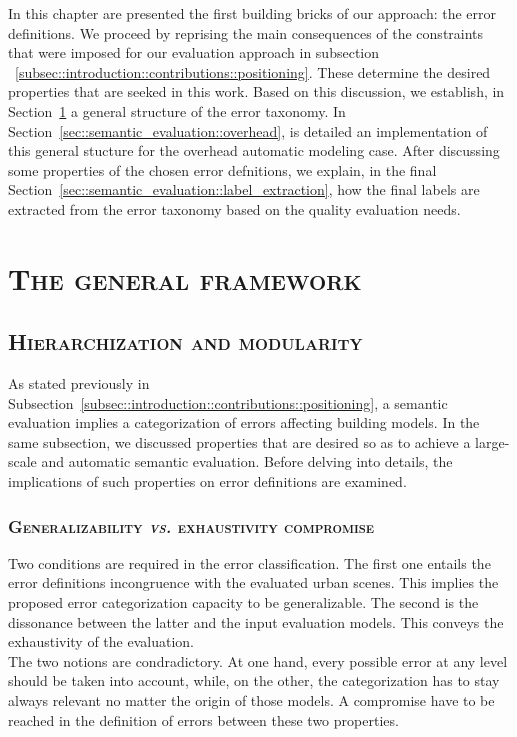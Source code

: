 \minitoc

\vfill

In this chapter are presented the first building bricks of our approach: the error definitions.
We proceed by reprising the main consequences of the constraints that were imposed for our evaluation approach in subsection ~\ref{subsec::introduction::contributions::positioning}.
These determine the desired properties that are seeked in this work.
Based on this discussion, we establish, in Section~\ref{sec::semantic_evaluation::general_framework} a general structure of the error taxonomy.
In Section~\ref{sec::semantic_evaluation::overhead}, is detailed an implementation of this general stucture for the overhead automatic modeling case.
After discussing some properties of the chosen error defnitions, we explain, in the final Section~\ref{sec::semantic_evaluation::label_extraction}, how the final labels are extracted from the error taxonomy based on the quality evaluation needs.

\clearpage

\section{\textsc{The general framework}}
    \label{sec::semantic_evaluation::general_framework}

    \subsection{\textsc{Hierarchization and modularity}}
        \label{subsec::semantic_evaluation::general_framework::hierarchization_moderularity}
        As stated previously in Subsection~\ref{subsec::introduction::contributions::positioning}, a semantic evaluation implies a categorization of errors affecting building models.
        In the same subsection, we discussed properties that are desired so as to achieve a large-scale and automatic semantic evaluation.
        Before delving into details, the implications of such properties on error definitions are examined.

        \subsubsection{\textsc{Generalizability \textit{vs.} exhaustivity compromise}}
            Two conditions are required in the error classification.
            The first one entails the error definitions incongruence with the evaluated urban scenes.
            This implies the proposed error categorization capacity to be generalizable.
            The second is the dissonance between the latter and the input evaluation models.
            This conveys the exhaustivity of the evaluation.\\
            The two notions are condradictory.
            At one hand, every possible error at any level should be taken into account, while, on the other, the categorization has to stay always relevant no matter the origin of those models.
            A compromise have to be reached in the definition of errors between these two properties.
        
